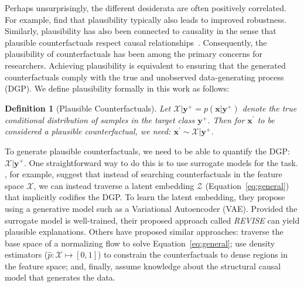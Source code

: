\documentclass{article}
\newtheorem{definition}{Definition}[section]
\begin{document}
Perhaps unsurprisingly, the different desiderata are often positively correlated. For example, \citet{artelt2021evaluating} find that plausibility typically also leads to improved robustness. Similarly, plausibility has also been connected to causality in the sense that plausible counterfactuals respect causal relationships~\citep{mahajan2020preserving}. Consequently, the plausibility of counterfactuals has been among the primary concerns for researchers. Achieving plausibility is equivalent to ensuring that the generated counterfactuals comply with the true and unobserved data-generating process (DGP). We define plausibility formally in this work as follows:

\begin{definition}[Plausible Counterfactuals]
  \label{def:plausible}
  Let $\mathcal{X}|\mathbf{y}^+= p(\mathbf{x}|\mathbf{y}^+)$ denote the true conditional distribution of samples in the target class $\mathbf{y}^+$. Then for $\mathbf{x}^{\prime}$ to be considered a plausible counterfactual, we need: $\mathbf{x}^{\prime} \sim \mathcal{X}|\mathbf{y}^+$.
\end{definition}

To generate plausible counterfactuals, we need to be able to quantify the DGP: $\mathcal{X}|\mathbf{y}^+$. One straightforward way to do this is to use surrogate models for the task. \citet{joshi2019realistic}, for example, suggest that instead of searching counterfactuals in the feature space $\mathcal{X}$, we can instead traverse a latent embedding $\mathcal{Z}$ (Equation~\ref{eq:general}) that implicitly codifies the DGP. To learn the latent embedding, they propose using a generative model such as a Variational Autoencoder (VAE). Provided the surrogate model is well-trained, their proposed approach called \textit{REVISE} can yield plausible explanations. Others have proposed similar approaches: \citet{dombrowski2021diffeomorphic} traverse the base space of a normalizing flow to solve Equation~\ref{eq:general}; \citet{poyiadzi2020face} use density estimators ($\hat{p}: \mathcal{X} \mapsto [0,1]$) to constrain the counterfactuals to dense regions in the feature space; and, finally, \citet{karimi2021algorithmic} assume knowledge about the structural causal model that generates the data.
\end{document}

